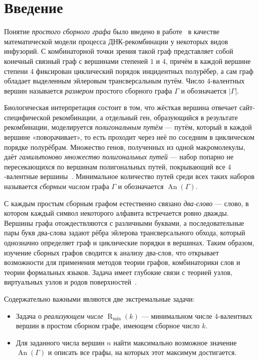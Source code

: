 \documentclass{article}
\theoremstyle{definition}
\newcommand{\An}{\operatorname{An}}
\newcommand{\Rmin}{\operatorname{R}_{\min}}
\begin{document}
\section{Введение}

Понятие \emph{простого сборного графа} было введено в работе~\cite{Angeleska2009} в качестве математической модели процесса ДНК-рекомбинации у некоторых видов инфузорий. С комбинаторной точки зрения такой граф представляет собой конечный связный граф с вершинами степеней $1$ и $4$, причём в каждой вершине степени $4$ фиксирован циклический порядок инцидентных полурёбер, а сам граф обладает выделенным эйлеровым трансверсальным путём. Число $4$-валентных вершин называется \emph{размером} простого сборного графа $\Gamma$ и обозначается $|\Gamma|$.

Биологическая интерпретация состоит в том, что жёсткая вершина отвечает сайт-специфической рекомбинации, а отдельный ген, образующийся в результате рекомбинации, моделируется \emph{полигональным путём} — путём, который в каждой вершине «поворачивает», то есть проходит через неё по соседним в циклическом порядке полурёбрам. Множество генов, полученных из одной макромолекулы, даёт \emph{гамильтоново множество полигональных путей} — набор попарно не пересекающихся по вершинам полигональных путей, покрывающий все $4$-валентные вершины~\cite{Muche2012}. Минимальное количество путей среди всех таких наборов называется \emph{сборным числом} графа $\Gamma$ и обозначается $\An(\Gamma)$.

С каждым простым сборным графом естественно связано \emph{два-слово} — слово, в котором каждый символ некоторого алфавита встречается ровно дважды. Вершины графа отождествляются с различными буквами, а последовательные пары букв два-слова задают рёбра эйлерова трансверсального обхода, который однозначно определяет граф и циклические порядки в вершинах. Таким образом, изучение сборных графов сводится к анализу два-слов, что открывает возможности для применения методов теории графов, комбинаторики слов и теории формальных языков. Задача имеет глубокие связи с теорией узлов, виртуальных узлов и родов поверхностей~\cite{Kauffman1999,Cairns1996}.

Содержательно важными являются две экстремальные задачи:
\begin{itemize}
    \item Задача о \emph{реализующем числе} $\Rmin(k)$ — минимальном числе $4$-валентных вершин в простом сборном графе, имеющем сборное число $k$.
    \item Для заданного числа вершин $n$ найти максимально возможное значение $\An(\Gamma)$ и описать все графы, на которых этот максимум достигается.
\end{itemize}
\end{document}
